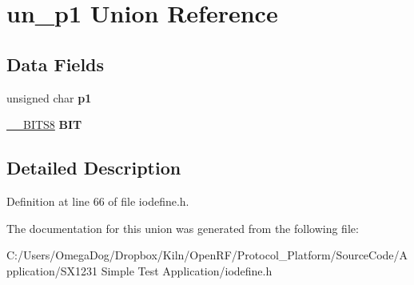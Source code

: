 \hypertarget{unionun__p1}{\section{un\-\_\-p1 Union Reference}
\label{unionun__p1}
}
\subsection*{Data Fields}
\begin{DoxyCompactItemize}
\item 
\hypertarget{unionun__p1_ad1b2755de598be2555b34f955ca35c9b}{unsigned char {\bfseries p1}}\label{unionun__p1_ad1b2755de598be2555b34f955ca35c9b}

\item 
\hypertarget{unionun__p1_a8e6cd9b27aed7f10cfa3ea23ff8e26cc}{\hyperlink{struct_____b_i_t_s8}{\-\_\-\-\_\-\-B\-I\-T\-S8} {\bfseries B\-I\-T}}\label{unionun__p1_a8e6cd9b27aed7f10cfa3ea23ff8e26cc}

\end{DoxyCompactItemize}


\subsection{Detailed Description}


Definition at line 66 of file iodefine.\-h.



The documentation for this union was generated from the following file\-:\begin{DoxyCompactItemize}
\item 
C\-:/\-Users/\-Omega\-Dog/\-Dropbox/\-Kiln/\-Open\-R\-F/\-Protocol\-\_\-\-Platform/\-Source\-Code/\-Application/\-S\-X1231 Simple Test Application/iodefine.\-h\end{DoxyCompactItemize}

